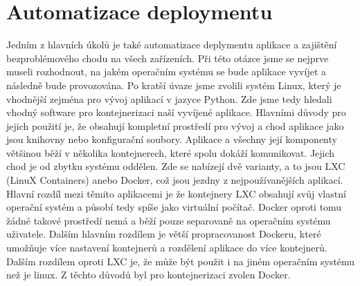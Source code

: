 \section{Automatizace deploymentu}

Jedním z hlavních úkolů je také automatizace deplymentu aplikace a
zajištění bezproblémového chodu na všech zařízeních. Při této otázce
jsme se nejprve museli rozhodnout, na jakém operačním systému se bude
aplikace vyvíjet a následně bude provozována. Po kratší úvaze jsme
zvolili systém Linux, který je vhodnější zejména pro vývoj aplikací v
jazyce Python. Zde jsme tedy hledali vhodný software pro
kontejnerizaci naší vyvíjené aplikace. Hlavními důvody pro jejich
použití je, že obsahují kompletní prostředí pro vývoj a chod aplikace
jako jsou knihovny nebo konfigurační soubory. Aplikace a všechny její
komponenty většinou běží v několika kontejnerech, které spolu dokáží
komunikovat. Jejich chod je od zbytku systému oddělen. Zde se nabízejí
dvě varianty, a to jsou LXC (LinuX Containers) anebo Docker, což jsou
jezdny z nejpoužívanějších aplikací. Hlavní rozdíl mezi těmito
aplikacemi je že kontejnery LXC obsahují svůj vlastní operační systém
a působí tedy spíše jako virtuální počítač. Docker oproti tomu žádné
takové prostředí nemá a běží pouze separovaně na operačním systému
uživatele. Dalším hlavním rozdílem je větší propracovanost Dockeru,
které umožňuje více nastavení kontejnerů a rozdělení aplikace do více
kontejnerů. Dalším rozdílem oproti LXC je, že může být použit i na
jiném operačním systému než je linux. Z těchto důvodů byl pro
kontejnerizaci zvolen Docker.

\textbf{}
\textit{}



















